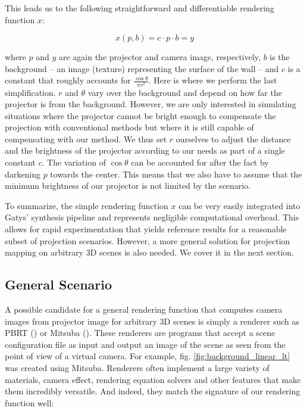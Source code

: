 This leads us to the following straightforward and differentiable rendering function \(x\):

\begin{equation}
    \label{eq:rendering_function-simple}
    x(p, b) = c \cdot p \cdot b = y
\end{equation}

where \(p\) and \(y\) are again the projector and camera image, respectively, \(b\) is the background -- an image (texture) representing the surface of the wall -- and \(c\) is a constant that roughly accounts for \(\frac{\cos \theta}{\pi r^2}\). Here is where we perform the last simplification. \(r\) and \(\theta\) vary over the background and depend on how far the projector is from the background. However, we are only interested in simulating situations where the projector cannot be bright enough to compensate the projection with conventional methods but where it is still capable of compensating with our method. We thus set \(r\) ourselves to adjust the distance and the brightness of the projector according to our needs as part of a single constant \(c\). The variation of \(\cos \theta\) can be accounted for after the fact by darkening \(p\) towards the center. This means that we also have to assume that the minimum brightness of our projector is not limited by the scenario.

To summarize, the simple rendering function \(x\) can be very easily integrated into Gatys' synthesis pipeline and represents negligible computational overhead. This allows for rapid experimentation that yields reference results for a reasonable subset of projection scenarios. However, a more general solution for projection mapping on arbitrary 3D scenes is also needed. We cover it in the next section.

\subsection{General Scenario}
\label{section:methods-rendering_function-general}

A possible candidate for a general rendering function that computes camera images from projector image for arbitrary 3D scenes is simply a renderer such as PBRT (\citet{PBRT3e}) or Mitsuba (\citet{Mitsuba}). These renderers are programs that accept a scene configuration file as input and output an image of the scene as seen from the point of view of a virtual camera. For example, fig. \ref{fig:background_linear_lt} was created using Mitsuba. Renderers often implement a large variety of materials, camera effect, rendering equation solvers and other features that make them incredibly versatile. And indeed, they match the signature of our rendering function well:

